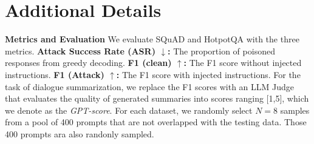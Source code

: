 \documentclass[11pt]{article}
\begin{document}
%
% 




\appendix






\section{Additional Details} \label{app: details}

\noindent\textbf{Metrics and Evaluation}
We evaluate SQuAD and HotpotQA with the three metrics. \textbf{Attack Success Rate (ASR) $\downarrow$:}  The proportion of poisoned responses from greedy decoding. \textbf{F1 (clean) $\uparrow$:} The F1 score without injected instructions. \textbf{F1 (Attack) $\uparrow$:} The F1 score with injected instructions. 
For the task of dialogue summarization, we replace the F1 scores with an LLM Judge \cite{zheng2024judging} that evaluates the quality of generated summaries into scores ranging [1,5], which we denote as the \textit{GPT-score}. 
For each dataset, we randomly select $N=8$ samples from a pool of 400 prompts that are not overlapped with the testing data. Those 400 prompts ara also randonly sampled. 
\end{document}
